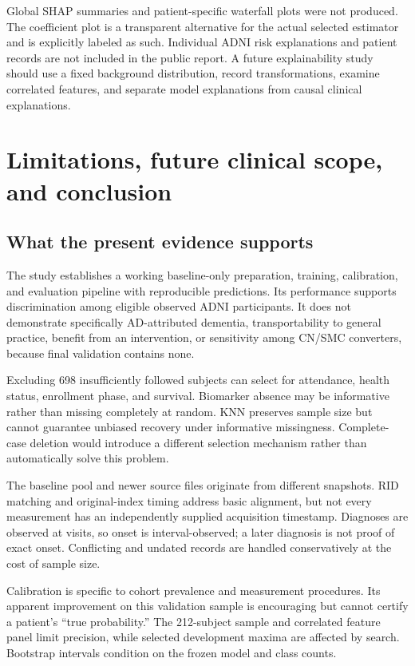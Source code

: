 \documentclass[11pt,a4paper]{article}
\begin{document}
Global SHAP summaries and patient-specific waterfall plots were not produced. The coefficient plot is a transparent alternative for the actual selected estimator and is explicitly labeled as such. Individual ADNI risk explanations and patient records are not included in the public report. A future explainability study should use a fixed background distribution, record transformations, examine correlated features, and separate model explanations from causal clinical explanations.

\clearpage
\section{Limitations, future clinical scope, and conclusion}
\subsection{What the present evidence supports}
The study establishes a working baseline-only preparation, training, calibration, and evaluation pipeline with reproducible predictions. Its performance supports discrimination among eligible observed ADNI participants. It does not demonstrate specifically AD-attributed dementia, transportability to general practice, benefit from an intervention, or sensitivity among CN/SMC converters, because final validation contains none.

Excluding 698 insufficiently followed subjects can select for attendance, health status, enrollment phase, and survival. Biomarker absence may be informative rather than missing completely at random. KNN preserves sample size but cannot guarantee unbiased recovery under informative missingness. Complete-case deletion would introduce a different selection mechanism rather than automatically solve this problem.

The baseline pool and newer source files originate from different snapshots. RID matching and original-index timing address basic alignment, but not every measurement has an independently supplied acquisition timestamp. Diagnoses are observed at visits, so onset is interval-observed; a later diagnosis is not proof of exact onset. Conflicting and undated records are handled conservatively at the cost of sample size.

Calibration is specific to cohort prevalence and measurement procedures. Its apparent improvement on this validation sample is encouraging but cannot certify a patient's ``true probability.'' The 212-subject sample and correlated feature panel limit precision, while selected development maxima are affected by search. Bootstrap intervals condition on the frozen model and class counts.
\end{document}
